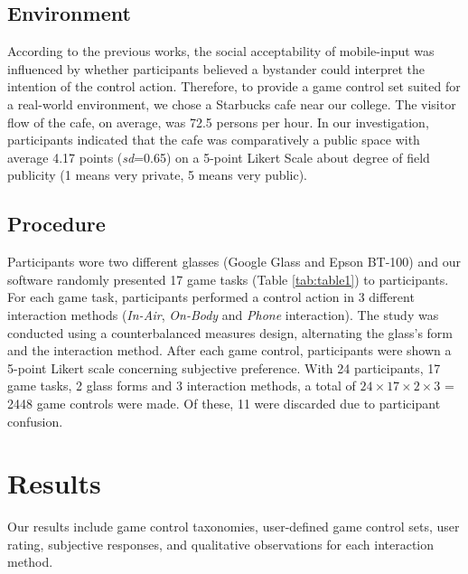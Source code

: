 \documentclass{sigchi}
\begin{document}
  \subsection {Environment}
  According to the previous works\cite{Wiliamson:2011:MMI:2070481.2070551,Williamson:2013:MEM:2522848.2522874,Montero:2010:YUS:1851600.1851647,Rico:2010:UGM:1753326.1753458}, the social acceptability of mobile-input was influenced by whether participants believed a bystander could interpret the intention of the control action. Therefore, to provide a game control set suited for a real-world environment, we chose a Starbucks cafe near our college. The visitor flow of the cafe, on average, was 72.5 persons per hour. In our investigation, participants indicated that the cafe was comparatively a public space with average 4.17 points (\textsl{sd}=0.65) on a 5-point Likert Scale about degree of field publicity (1 means very private, 5 means very public).    

  

    \subsection {Procedure}
    Participants wore two different glasses (Google Glass and Epson BT-100) and our software randomly presented 17 game tasks (Table \ref{tab:table1}) to participants. For each game task, participants performed a control action in 3 different interaction methods (\emph{In-Air}, \emph{On-Body} and \emph{Phone} interaction). The study was conducted using a counterbalanced measures design, alternating the glass's form and the interaction method. After each game control, participants were shown a 5-point Likert scale concerning subjective preference. With 24 participants, 17 game tasks, 2 glass forms and 3 interaction methods, a total of $24 \times 17 \times 2 \times 3$ = 2448 game controls were made. Of these, 11 were discarded due to participant confusion. 

\section{Results}

Our results include game control taxonomies, user-defined game control sets, user rating, subjective responses, and qualitative observations for each interaction method.
\end{document}
